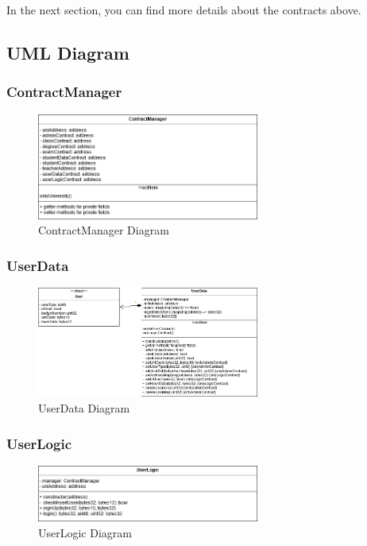 In the next section, you can find more details about the contracts above.

\subsection{UML Diagram}

\subsubsection{ContractManager}
\begin{figure}[!h]
	\centering
	\includegraphics[width=0.65\textwidth]{img/Contracts/ContractManager.png}
	\caption{ContractManager Diagram}
\end{figure}
\clearpage
\subsubsection{UserData}
\begin{figure}[!h]
	\centering
	\includegraphics[width=0.65\textwidth]{img/Contracts/UserData.png}
	\caption{UserData Diagram}
\end{figure}
\subsubsection{UserLogic}
\begin{figure}[!h]
	\centering
	\includegraphics[width=0.65\textwidth]{img/Contracts/UserLogic.png}
	\caption{UserLogic Diagram}
\end{figure}
